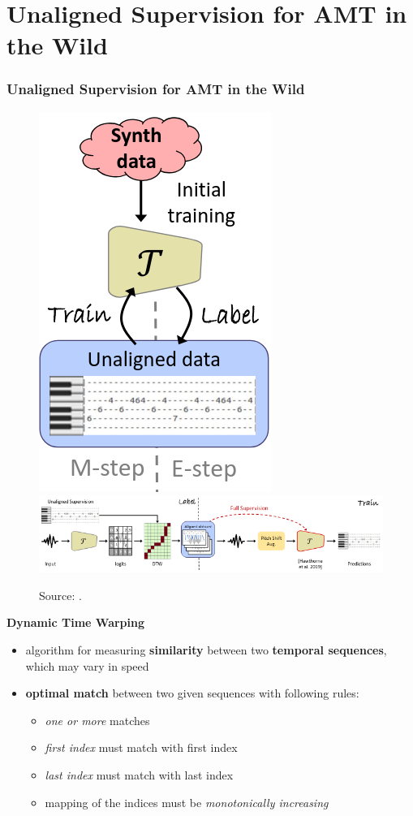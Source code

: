 \documentclass{beamer}
\newcommand{\emp}[1]{\textcolor{tum}{\textbf{#1}}}
\begin{document}
\section{Unaligned Supervision for AMT in the Wild}
\begin{frame}[allowframebreaks]
	\frametitle{Unaligned Supervision for AMT in the Wild}

	\begin{figure}[!ht]
		\centering
		\includegraphics[width=.2\textwidth]{AMT-general.png}%
		\label{fig:AMT-general}
		\includegraphics[width=.9\textwidth]{AMT-scheme.png}%
		\label{fig:AMT-scheme}
		\caption{Source: \cite{AMT}.}
	\end{figure}

	\framebreak

	\emp{Dynamic Time Warping}

	\begin{itemize}
		\item algorithm for measuring \textbf{similarity} between two \textbf{temporal sequences}, which may vary in speed
		\item \textbf{optimal match} between two given sequences with following rules:

		      \begin{itemize}
			      \item \textit{one or more} matches
			      \item \textit{first index} must match with first index
			      \item \textit{last index} must match with last index
			      \item mapping of the indices must be \textit{monotonically increasing}
		      \end{itemize}

	\end{itemize}


\end{frame}
\end{document}
